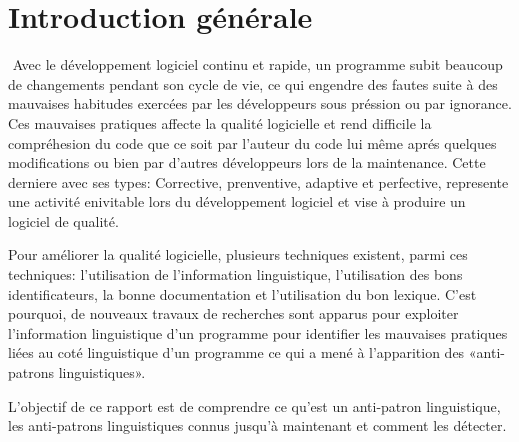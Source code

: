 ﻿\chapter*{Introduction générale}
﻿%
\tab Avec le développement logiciel continu et rapide, un programme subit beaucoup de changements pendant son cycle de vie, ce qui engendre des fautes suite à des mauvaises habitudes exercées par les développeurs sous préssion ou par ignorance. Ces mauvaises pratiques affecte la qualité logicielle et rend difficile la compréhesion du code que ce soit par l’auteur du code lui même aprés quelques modifications ou bien par d’autres développeurs lors de la maintenance. Cette derniere avec ses types: Corrective, prenventive, adaptive et  perfective, represente une activité enivitable lors du développement logiciel et vise à produire un logiciel de qualité. \\ \tab

Pour améliorer la qualité logicielle, plusieurs techniques existent, parmi ces techniques: l’utilisation de l’information linguistique, l’utilisation des bons identificateurs, la bonne documentation et l’utilisation du bon lexique. C’est pourquoi, de nouveaux travaux de recherches sont apparus pour exploiter l’information linguistique d’un programme pour identifier les mauvaises pratiques liées au coté linguistique d’un programme ce qui a mené à l’apparition des «anti-patrons linguistiques». \\ \tab

L’objectif de ce rapport est de comprendre ce qu’est un anti-patron linguistique, les anti-patrons linguistiques connus jusqu’à maintenant et comment les détecter.